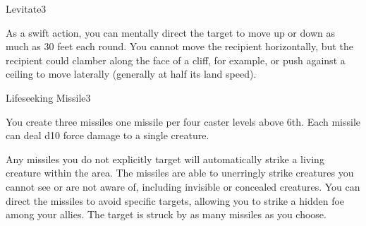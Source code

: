 \begin{spellsection}{Levitate}{3}
\begin{spellheader}
\end{spellheader}
\begin{spellcontent}
    \begin{spelltargetinginfo}
        \spellrng{\rngclose}
    \end{spelltargetinginfo}
    \begin{spelleffects}
        \spelleffect As a swift action, you can mentally direct the target to move up or down as much as 30 feet each round. You cannot move the recipient horizontally, but the recipient could clamber along the face of a cliff, for example, or push against a ceiling to move laterally (generally at half its land speed).
        \spelldur \durshort \dismissable
    \end{spelleffects}
\end{spellcontent}
\begin{spellfooter}
\end{spellfooter}
\end{spellsection}

\begin{spellsection}{Lifeseeking Missile}{3}
\begin{spellheader}
\end{spellheader}
\begin{spellcontent}
    \begin{spelltargetinginfo}
    \end{spelltargetinginfo}
    \begin{spelleffects}
        \spellspecial You create three missiles \add one missile per four caster levels above 6th. Each missile can deal d10 force damage to a single creature.

        Any missiles you do not explicitly target will automatically strike a living creature within the area. The missiles are able to unerringly strike creatures you cannot see or are not aware of, including invisible or concealed creatures. You can direct the missiles to avoid specific targets, allowing you to strike a hidden foe among your allies.
        \spelleffect The target is struck by as many missiles as you choose.
    \end{spelleffects}
\end{spellcontent}
\begin{spellfooter}
\end{spellfooter}
\end{spellsection}

